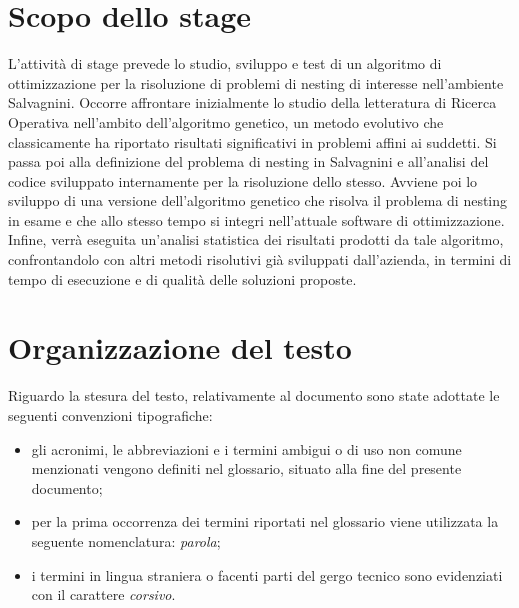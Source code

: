 \section{Scopo dello stage}

L’attività di stage prevede lo studio, sviluppo e test di un algoritmo di ottimizzazione per la risoluzione di problemi di nesting di interesse nell’ambiente Salvagnini.
Occorre affrontare inizialmente lo studio della letteratura di Ricerca Operativa nell’ambito dell’algoritmo genetico, un metodo evolutivo che classicamente ha riportato risultati significativi in problemi affini ai suddetti. Si passa poi alla definizione del problema di nesting in Salvagnini e all’analisi del codice sviluppato internamente per la risoluzione dello stesso. Avviene poi lo sviluppo di una versione dell’algoritmo genetico che risolva il problema di nesting in esame e che allo stesso tempo si integri nell’attuale software di ottimizzazione. Infine, verrà eseguita un’analisi statistica dei risultati prodotti da tale algoritmo, confrontandolo con altri metodi risolutivi già sviluppati dall’azienda, in termini di tempo di esecuzione e di qualità delle soluzioni proposte.

\section{Organizzazione del testo}

    
    
    
    
    

Riguardo la stesura del testo, relativamente al documento sono state adottate le seguenti convenzioni tipografiche:
\begin{itemize}
	\item gli acronimi, le abbreviazioni e i termini ambigui o di uso non comune menzionati vengono definiti nel glossario, situato alla fine del presente documento;
	\item per la prima occorrenza dei termini riportati nel glossario viene utilizzata la seguente nomenclatura: \emph{parola}\glsfirstoccur;
	\item i termini in lingua straniera o facenti parti del gergo tecnico sono evidenziati con il carattere \emph{corsivo}.
\end{itemize}
